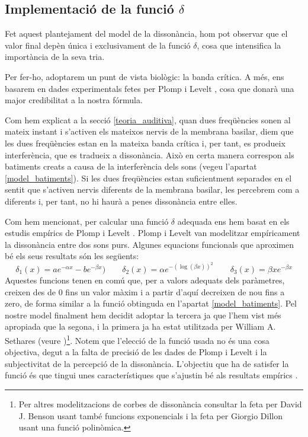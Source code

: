 \documentclass{article}
\theoremstyle{math}
\newcommand{\0}{\ensuremath{\vb{0}}}
\begin{document}
\subsection{Implementació de la funció \texorpdfstring{$\delta$}{d}} 
Fet aquest plantejament del model de la dissonància, hom pot observar que el valor final depèn única i exclusivament de la funció $\delta$, cosa que intensifica la importància de la seva tria.\par
Per fer-ho, adoptarem un punt de vista biològic: la banda crítica. A més, ens basarem en dades experimentals fetes per Plomp i Levelt \cite{plomp}, cosa que donarà una major credibilitat a la nostra fórmula.\par Com hem explicat a la secció \ref{teoria_auditiva}, quan dues freqüències sonen al mateix instant i s'activen els mateixos nervis de la membrana basilar, diem que les dues freqüències estan en la mateixa banda crítica i, per tant, es produeix interferència, que es tradueix a dissonància. Això en certa manera correspon als batiments creats a causa de la interferència dels sons (vegeu l'apartat \ref{model_batiments}). Si les dues freqüències estan suficientment separades en el sentit que s'activen nervis diferents de la membrana basilar, les percebrem com a diferents i, per tant, no hi haurà a penes dissonància entre elles.\par 
Com hem mencionat, per calcular una funció $\delta$ adequada ens hem basat en els estudis empírics de Plomp i Levelt \cite{plomp}. Plomp i Levelt van modelitzar empíricament la dissonància entre dos sons purs. Algunes equacions funcionals que aproximen bé els seus resultats són les següents: $$\delta_1(x)=ae^{-\alpha x}-be^{-\beta x})\qquad\delta_2(x)=\alpha e^{-\left(\log(\beta x)\right)^2}\qquad\delta_3(x)=\beta xe^{-\beta x}$$
Aquestes funcions tenen en comú que, per a valors adequats dels paràmetres, creixen des de 0 fins un valor màxim i a partir d'aquí decreixen de nou fins a zero, de forma similar a la funció obtinguda en l'apartat \ref{model_batiments}. Pel nostre model finalment hem decidit adoptar la tercera ja que l'hem vist més apropiada que la segona, i la primera ja ha estat utilitzada per William A. Sethares (veure \cite{sethares1})\footnote{Per altres modelitzacions de corbes de dissonància consultar la feta per David J. Benson \cite{benson} usant també funcions exponencials i la feta per Giorgio Dillon \cite{dillon} usant una funció polinòmica.}. Notem que l'elecció de la funció usada no és una cosa objectiva, degut a la falta de precisió de les dades de Plomp i Levelt i la subjectivitat de la percepció de la dissonància. L'objectiu que ha de satisfer la funció és que tingui unes característiques que s'ajustin bé als resultats empírics \cite{benson}.\par
\end{document}
